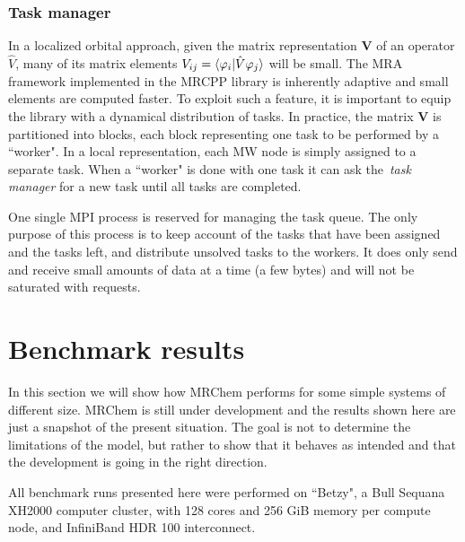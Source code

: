 \documentclass[journal=jctcce, manuscript=article]{achemso}
\begin{document}

\subsubsection{Task manager} 
In a localized orbital approach, given the matrix representation $\mathbf{V}$ of an operator $\hat{V}$, many of its matrix elements $V_{ij} = \braket{\varphi_i|{\hat V} \varphi_j}$ will be small. The \ac{MRA} framework implemented in the MRCPP library is inherently adaptive and small elements are computed faster. To exploit such a feature, it is important to equip the library with a dynamical distribution of tasks.
In practice, the matrix $\mathbf{V}$ is partitioned into blocks, each block representing one task to be performed by a ``worker". In a local representation, each \ac{MW} node is simply assigned to a separate task. When a ``worker" is done with one task it can ask the~\emph{task manager} for a new task until all tasks are completed.

One single MPI process is reserved for managing the task queue. The only purpose of this process is to keep account of the tasks that have been assigned and the tasks left, and distribute unsolved tasks to the workers. It does only send and receive small amounts of data at a time (a few bytes) and will not be saturated with requests.


\section{Benchmark results}
In this section we will show how MRChem performs for some simple systems of different size. MRChem is still under development and the results shown here are just a snapshot of the present situation. The goal is not to determine the limitations of the model, but rather to show that it behaves as intended and that the development is going in the right direction.

All benchmark runs presented here were performed on ``Betzy", a Bull Sequana XH2000 computer cluster, with 128 cores and 256 GiB memory per compute node, and InfiniBand HDR 100 interconnect.\cite{Betzy}
\end{document}
